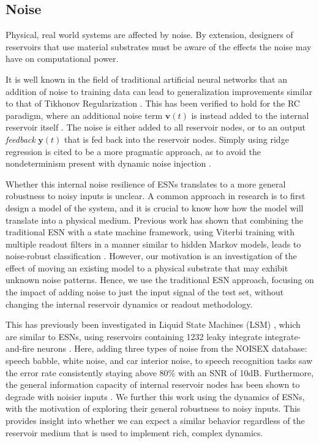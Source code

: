 \subsection{Noise}

Physical, real world systems are affected by noise. By extension, designers of
reservoirs that use material substrates must be aware of the effects the noise
may have on computational power.

It is well known in the field of traditional artificial neural networks that an
addition of noise to training data can lead to generalization improvements
similar to that of Tikhonov Regularization \cite{bishop_training_1995}. This has
been verified to hold for the RC paradigm, where an additional noise term
$\mathbf{v}(t)$ is instead added to the internal reservoir itself
\cite{jaeger_echo_2001}. The noise is either added to all reservoir nodes, or to
an output \textit{feedback} $\mathbf{y}(t)$ that is fed back into the reservoir
nodes. Simply using ridge regression is cited to be a more pragmatic approach,
as to avoid the nondeterminism present with dynamic noise injection
\cite{kurkova_stable_2008}.

Whether this internal noise resilience of ESNs translates to a more general
robustness to noisy inputs is unclear. A common approach in research is to first
design a model of the system, and it is crucial to know how how the model will
translate into a physical medium. Previous work has shown that combining the
traditional ESN with a state machine framework, using Viterbi training with
multiple readout filters in a manner similar to hidden Markov models, leads to
noise-robust classification \cite{skowronski_noise-robust_2007}. However, our
motivation is an investigation of the effect of moving an existing model to a
physical substrate that may exhibit unknown noise patterns. Hence, we use the
traditional ESN approach, focusing on the impact of adding noise to just the
input signal of the test set, without changing the internal reservoir dynamics
or readout methodology.

This has previously been investigated in Liquid State Machines (LSM)
\cite{maass_real-time_2002}, which are similar to ESNs, using reservoirs
containing 1232 leaky integrate integrate-and-fire neurons
\cite{verstraeten_isolated_2005}. Here, adding three types of noise from the
NOISEX database: speech babble, white noise, and car interior noise, to speech
recognition tasks saw the error rate consistently staying above 80\% with an SNR
of 10dB. Furthermore, the general information capacity of internal reservoir
nodes has been shown to degrade with noisier inputs
\cite{dambre_information_2012}. We further this work using the dynamics of ESNs,
with the motivation of exploring their general robustness to noisy inputs. This
provides insight into whether we can expect a similar behavior regardless of the
reservoir medium that is used to implement rich, complex dynamics.

